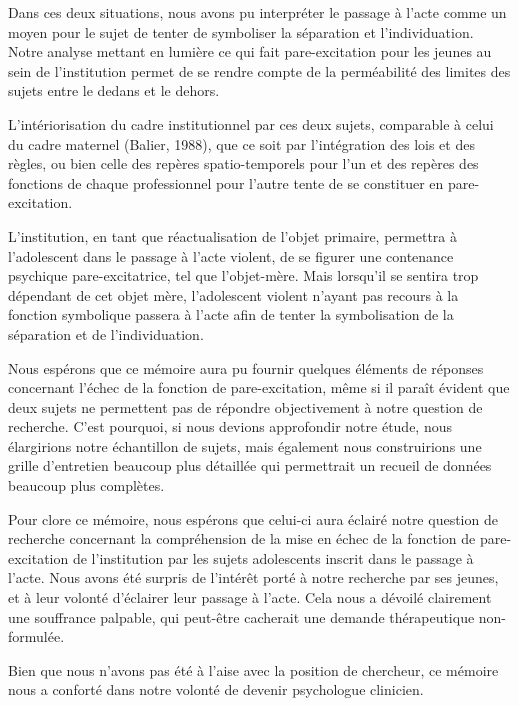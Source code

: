 \documentclass[12pt, a4paper]{book}
\begin{document}
\begin{spacing}{1.5}
Dans ces deux situations, nous avons pu interpréter le passage à l'acte comme un moyen pour le sujet de tenter de symboliser la séparation et l'individuation. Notre analyse mettant en lumière ce qui fait pare-excitation pour les jeunes au sein de l'institution permet de se rendre compte de la perméabilité des limites des sujets entre le dedans et le dehors. 

L'intériorisation du cadre institutionnel par ces deux sujets, comparable à celui du cadre maternel (Balier, 1988), que ce soit par l'intégration des lois et des règles, ou bien celle des repères spatio-temporels pour l'un et des repères des fonctions de chaque professionnel pour l'autre tente de se constituer en pare-excitation.   

L'institution, en tant que réactualisation de l'objet primaire, permettra à l'adolescent dans le passage à l'acte violent, de se figurer une contenance psychique pare-excitatrice, tel que l'objet-mère. Mais lorsqu'il se sentira trop dépendant de cet objet mère, l'adolescent violent n'ayant pas recours à la fonction symbolique passera à l'acte afin de tenter la symbolisation de la séparation et de l'individuation.

Nous espérons que ce mémoire aura pu fournir quelques éléments de réponses concernant l'échec de la fonction de pare-excitation, même si il paraît évident que deux sujets ne permettent pas de répondre objectivement à notre question de recherche. C'est pourquoi, si nous devions approfondir notre étude, nous élargirions notre échantillon de sujets, mais également nous construirions une grille d'entretien beaucoup plus détaillée qui permettrait un recueil de données beaucoup plus complètes.

Pour clore ce mémoire, nous espérons que celui-ci aura éclairé notre question de recherche concernant la compréhension de la mise en échec de la fonction de pare-excitation de l'institution par les sujets adolescents inscrit dans le passage à l'acte. Nous avons été surpris de l'intérêt porté à notre recherche par ses jeunes, et à leur volonté d'éclairer leur passage à l'acte. Cela nous a dévoilé clairement une souffrance palpable, qui peut-être cacherait une demande thérapeutique non-formulée.

Bien que nous n'avons pas été à l'aise avec la position de chercheur, ce mémoire nous a conforté dans notre volonté de devenir psychologue clinicien.
\renewcommand{\indexname}{Index onomastique}
\printindex
\end{spacing}
\end{document}
